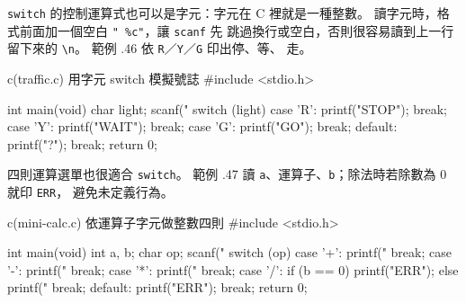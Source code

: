 

\texttt{switch} 的控制運算式也可以是字元：字元在 C 裡就是一種整數。
讀字元時，格式前面加一個空白 \texttt{" \%c"}，讓 \texttt{scanf} 先
跳過換行或空白，否則很容易讀到上一行留下來的 \texttt{\textbackslash n}。
範例 \thechapter.46 依 \texttt{R}／\texttt{Y}／\texttt{G} 印出停、等、
走。

\begin{example}{c}{(traffic.c) 用字元 switch 模擬號誌}
#include <stdio.h>

int main(void) {
    char light;
    scanf(" %
    switch (light) {
        case 'R':
            printf("STOP\n");
            break;
        case 'Y':
            printf("WAIT\n");
            break;
        case 'G':
            printf("GO\n");
            break;
        default:
            printf("?\n");
            break;
    }
    return 0;
}
\end{example}


四則運算選單也很適合 \texttt{switch}。 範例 \thechapter.47 讀
\texttt{a}、運算子、\texttt{b}；除法時若除數為 $0$ 就印 \texttt{ERR}，
避免未定義行為。

\begin{example}{c}{(mini-calc.c) 依運算子字元做整數四則}
#include <stdio.h>

int main(void) {
    int a, b;
    char op;
    scanf("%
    switch (op) {
        case '+':
            printf("%
            break;
        case '-':
            printf("%
            break;
        case '*':
            printf("%
            break;
        case '/':
            if (b == 0) {
                printf("ERR\n");
            } else {
                printf("%
            }
            break;
        default:
            printf("ERR\n");
            break;
    }
    return 0;
}
\end{example}


